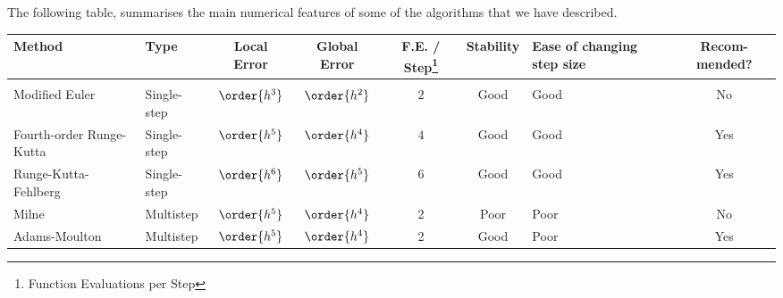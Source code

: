 
\smallskip

The following table, summarises the main numerical features of some of
the algorithms that we have described.

\smallskip

\begin{center} \begin{tabularx}{1.1\textwidth}{llccccXc} \hline
\textbf{Method} & \textbf{Type} & \parbox[b]{12mm}{\textbf{Local Error}} &
\parbox[b]{12mm}{\textbf{Global Error}} &
\parbox[b]{10mm}{\textbf{F.E. / Step\footnote{Function Evaluations per Step}}} &
\textbf{Stability} & 
\parbox[b]{15mm}{\textbf{Ease of changing step size}} &
\parbox[b]{10mm}{\textbf{Recom-mended?}} \\*[2mm] \hline \\
Modified Euler & Single-step & $\order{h^3}$ & $\order{h^2}$ & $2$ &
 Good & Good & No \\*[3mm]
\parbox[t]{25mm}{Fourth-order Runge-Kutta} & Single-step & $\order{h^5}$ & 
$\order{h^4}$ & $4$ & Good & Good & Yes \\*[7mm]
\parbox[t]{25mm}{Runge-Kutta-Fehlberg} & Single-step & $\order{h^6}$ & 
$\order{h^5}$ & $6$ & Good & Good & Yes \\*[7mm]
Milne & Multistep & $\order{h^5}$ & $\order{h^4}$ & 2 & Poor & Poor & No \\*[4mm]
Adams-Moulton & Multistep & $\order{h^5}$ & $\order{h^4}$ & 2 & Good & Poor &
Yes \\*[3mm] \hline
\end{tabularx} \end{center}

